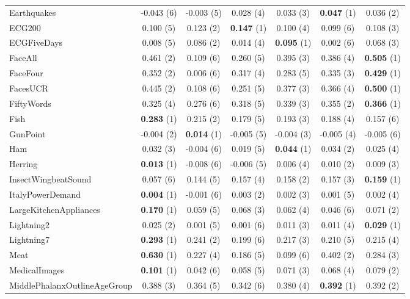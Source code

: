 \begin{table}[ht]
\begin{adjustbox}{width=\textwidth}
\begin{tabular}{lcccccc}
    Earthquakes & -0.043 (6) & -0.003 (5) & 0.028 (4) & 0.033 (3) & \textbf{0.047} (1) & 0.036 (2) \\
    ECG200 & 0.100 (5) & 0.123 (2) & \textbf{0.147} (1) & 0.100 (4) & 0.099 (6) & 0.108 (3) \\
    ECGFiveDays & 0.008 (5) & 0.086 (2) & 0.014 (4) & \textbf{0.095} (1) & 0.002 (6) & 0.068 (3) \\
    FaceAll & 0.461 (2) & 0.109 (6) & 0.260 (5) & 0.395 (3) & 0.386 (4) & \textbf{0.505} (1) \\
    FaceFour & 0.352 (2) & 0.006 (6) & 0.317 (4) & 0.283 (5) & 0.335 (3) & \textbf{0.429} (1) \\
    FacesUCR & 0.445 (2) & 0.108 (6) & 0.251 (5) & 0.377 (3) & 0.366 (4) & \textbf{0.500} (1) \\
    FiftyWords & 0.325 (4) & 0.276 (6) & 0.318 (5) & 0.339 (3) & 0.355 (2) & \textbf{0.366} (1) \\
    Fish & \textbf{0.283} (1) & 0.215 (2) & 0.179 (5) & 0.193 (3) & 0.188 (4) & 0.157 (6) \\
    GunPoint & -0.004 (2) & \textbf{0.014} (1) & -0.005 (5) & -0.004 (3) & -0.005 (4) & -0.005 (6) \\
    Ham & 0.032 (3) & -0.004 (6) & 0.019 (5) & \textbf{0.044} (1) & 0.034 (2) & 0.025 (4) \\
    Herring & \textbf{0.013} (1) & -0.008 (6) & -0.006 (5) & 0.006 (4) & 0.010 (2) & 0.009 (3) \\
    InsectWingbeatSound & 0.057 (6) & 0.144 (5) & 0.157 (4) & 0.158 (2) & 0.157 (3) & \textbf{0.159} (1) \\
    ItalyPowerDemand & \textbf{0.004} (1) & -0.001 (6) & 0.003 (2) & 0.002 (3) & 0.001 (5) & 0.002 (4) \\
    LargeKitchenAppliances & \textbf{0.170} (1) & 0.059 (5) & 0.068 (3) & 0.062 (4) & 0.046 (6) & 0.071 (2) \\
    Lightning2 & 0.025 (2) & 0.001 (5) & 0.001 (6) & 0.011 (3) & 0.011 (4) & \textbf{0.029} (1) \\
    Lightning7 & \textbf{0.293} (1) & 0.241 (2) & 0.199 (6) & 0.217 (3) & 0.210 (5) & 0.215 (4) \\
    Meat & \textbf{0.630} (1) & 0.227 (4) & 0.186 (5) & 0.099 (6) & 0.402 (2) & 0.284 (3) \\
    MedicalImages & \textbf{0.101} (1) & 0.042 (6) & 0.058 (5) & 0.071 (3) & 0.068 (4) & 0.079 (2) \\
    MiddlePhalanxOutlineAgeGroup & 0.388 (3) & 0.364 (5) & 0.342 (6) & 0.380 (4) & \textbf{0.392} (1) & 0.392 (2) \\

\end{tabular}
\end{adjustbox}
\end{table}
